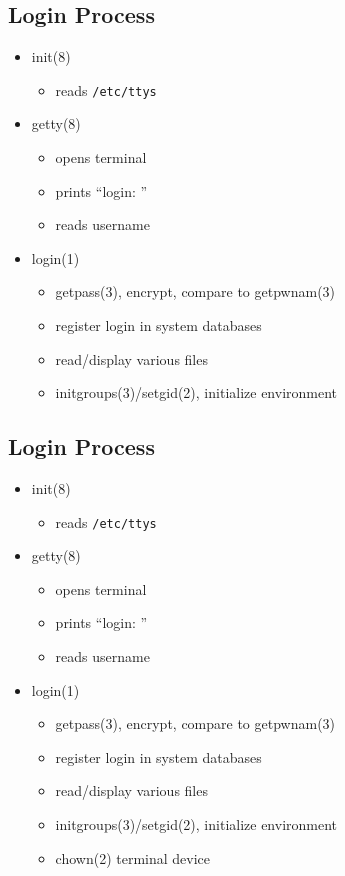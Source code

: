 \documentclass[xga]{xdvislides}
\begin{document}
\subsection{Login Process}
\begin{itemize}
	\item init(8)
		\begin{itemize}
			\item reads {\tt /etc/ttys}
		\end{itemize}
	\item getty(8)
		\begin{itemize}
			\item opens terminal
			\item prints ``login: ''
			\item reads username
		\end{itemize}
	\item login(1)
		\begin{itemize}
			\item getpass(3), encrypt, compare to getpwnam(3)
			\item register login in system databases
			\item read/display various files
			\item initgroups(3)/setgid(2), initialize environment
		\end{itemize}
\end{itemize}

\subsection{Login Process}
\begin{itemize}
	\item init(8)
		\begin{itemize}
			\item reads {\tt /etc/ttys}
		\end{itemize}
	\item getty(8)
		\begin{itemize}
			\item opens terminal
			\item prints ``login: ''
			\item reads username
		\end{itemize}
	\item login(1)
		\begin{itemize}
			\item getpass(3), encrypt, compare to getpwnam(3)
			\item register login in system databases
			\item read/display various files
			\item initgroups(3)/setgid(2), initialize environment
			\item chown(2) terminal device
		\end{itemize}
\end{itemize}
\end{document}
